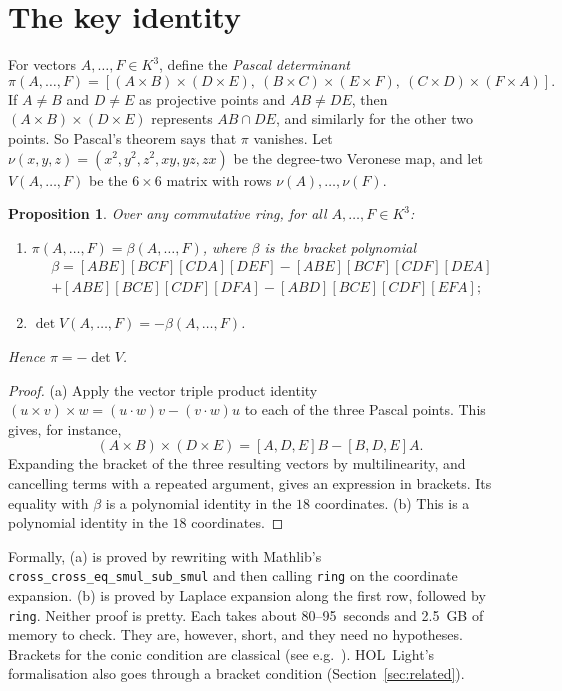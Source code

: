 \documentclass[11pt]{article}
\newtheorem{proposition}[theorem]{Proposition}
\theoremstyle{remark}
\newcommand{\lean}[1]{\texttt{#1}}
\newcommand{\br}[1]{[#1]}
\begin{document}
\section{The key identity}\label{sec:identity}

For vectors $A,\dots,F\in K^3$, define the \emph{Pascal determinant}
\[
\pi(A,\dots,F)=\br{(A\times B)\times(D\times E),\ (B\times C)\times(E\times F),\ (C\times D)\times(F\times A)}.
\]
If $A\ne B$ and $D\ne E$ as projective points and $AB\ne DE$, then $(A\times B)\times(D\times E)$
represents $AB\cap DE$, and similarly for the other two points. So Pascal's theorem says that
$\pi$ vanishes. Let $\nu(x,y,z)=(x^2,y^2,z^2,xy,yz,zx)$ be the degree-two Veronese map, and let
$V(A,\dots,F)$ be the $6\times6$ matrix with rows $\nu(A),\dots,\nu(F)$.

\begin{proposition}\label{prop:identity}
Over any commutative ring, for all $A,\dots,F\in K^3$:
\begin{enumerate}
\item[(a)] $\pi(A,\dots,F)=\beta(A,\dots,F)$, where $\beta$ is the bracket polynomial
\begin{multline*}
\beta=\br{ABE}\br{BCF}\br{CDA}\br{DEF}-\br{ABE}\br{BCF}\br{CDF}\br{DEA}\\
+\br{ABE}\br{BCE}\br{CDF}\br{DFA}-\br{ABD}\br{BCE}\br{CDF}\br{EFA};
\end{multline*}
\item[(b)] $\det V(A,\dots,F)=-\beta(A,\dots,F)$.
\end{enumerate}
Hence $\pi=-\det V$.
\end{proposition}

\begin{proof}
(a) Apply the vector triple product identity $(u\times v)\times w=(u\cdot w)v-(v\cdot w)u$ to each
of the three Pascal points. This gives, for instance,
\[
(A\times B)\times(D\times E)=\br{A,D,E}B-\br{B,D,E}A.
\]
Expanding the bracket of the three resulting vectors by multilinearity, and cancelling terms with a
repeated argument, gives an expression in brackets. Its equality with $\beta$ is a polynomial
identity in the $18$ coordinates. (b) This is a polynomial identity in the $18$ coordinates.
\end{proof}

Formally, (a) is proved by rewriting with Mathlib's \lean{cross\_cross\_eq\_smul\_sub\_smul} and
then calling \lean{ring} on the coordinate expansion. (b) is proved by Laplace expansion along the
first row, followed by \lean{ring}. Neither proof is pretty. Each takes about 80--95~seconds and
2.5~GB of memory to check. They are, however, short, and they need no hypotheses. Brackets for the
conic condition are classical (see e.g.~\cite{RichterGebert}). HOL~Light's formalisation also goes
through a bracket condition (Section~\ref{sec:related}).
\end{document}
